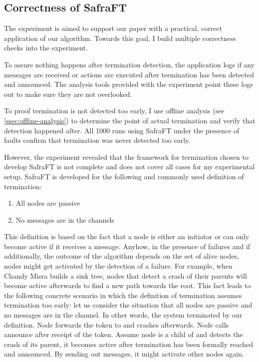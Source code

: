 \subsection{Correctness of SafraFT}
\label{ssec:correctness}
The experiment is aimed to support our paper with a practical, correct application of our algorithm.
Towards this goal, I build multiple correctness checks into the experiment. 

To assure nothing happens after termination detection, the application logs if any messages are received or actions are executed after termination has been detected and announced. 
The analysis tools provided with the experiment point these logs out to make sure they are not overlooked.

To proof termination is not detected too early, I use offline analysis (see \cref{ssec:offline-analysis}) to determine the point of actual termination and verify that detection happened after.
All 1000 runs using SafraFT under the presence of faults confirm that termination was never detected too early.

However, the experiment revealed that the framework for termination chosen to develop SafraFT is not complete and does not cover all cases for my experimental setup.
SafraFT is developed for the following and commonly used definition of termination:
\begin{enumerate}
	\item All nodes are passive
	\item No messages are in the channels
\end{enumerate}
This definition is based on the fact that a node is either an initiator or can only become active if it receives a message. 
Anyhow, in the presence of failures and if additionally, the outcome of the algorithm depends on the set of alive nodes, nodes might get activated by the detection of a failure.
For example, when Chandy Misra builds a sink tree, nodes that detect a crash of their parents will become active afterwards to find a new path towards the root.
This fact leads to the following concrete scenario in which the definition of termination assumes termination too early: let us consider the situation that all nodes are passive and no messages are in the channel. 
In other words, the system terminated by our definition.
Node  forwards the token to  and crashes afterwards. 
Node  calls announce after receipt of the token.
Assume node  is a child of  and detects the crash of its parent, it becomes active after termination has been formally reached and announced.
By sending out  messages, it might activate other nodes again.

